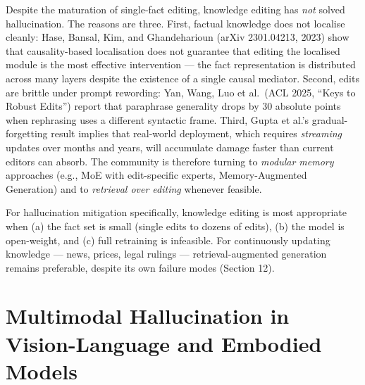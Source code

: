 \documentclass{article}
\begin{document}
Despite the maturation of single-fact editing, knowledge editing has \emph{not} solved hallucination. The reasons are three. First, factual knowledge does not localise cleanly: Hase, Bansal, Kim, and Ghandeharioun (arXiv 2301.04213, 2023) show that causality-based localisation does not guarantee that editing the localised module is the most effective intervention --- the fact representation is distributed across many layers despite the existence of a single causal mediator. Second, edits are brittle under prompt rewording: Yan, Wang, Luo et al.~(ACL 2025, ``Keys to Robust Edits'') report that paraphrase generality drops by 30 absolute points when rephrasing uses a different syntactic frame. Third, Gupta et al.'s gradual-forgetting result implies that real-world deployment, which requires \emph{streaming} updates over months and years, will accumulate damage faster than current editors can absorb. The community is therefore turning to \emph{modular memory} approaches (e.g., MoE with edit-specific experts, Memory-Augmented Generation) and to \emph{retrieval over editing} whenever feasible.

For hallucination mitigation specifically, knowledge editing is most appropriate when (a) the fact set is small (single edits to dozens of edits), (b) the model is open-weight, and (c) full retraining is infeasible. For continuously updating knowledge --- news, prices, legal rulings --- retrieval-augmented generation remains preferable, despite its own failure modes (Section 12).

\section{Multimodal Hallucination in Vision-Language and Embodied Models}\label{multimodal-hallucination-in-vision-language-and-embodied-models}
\end{document}
